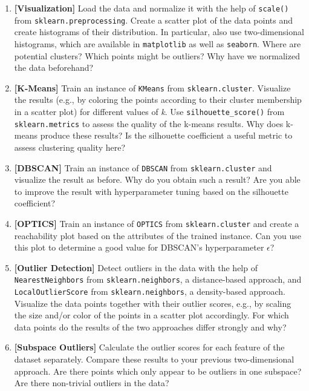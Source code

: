 \documentclass[12pt]{article}
\newcommand{\code}[1]{\textcolor{kitgreen}{\texttt{#1}}}
\newcommand{\taskname}[1]{\textcolor{kitblue}{\textbf{[#1]}}}
\begin{document}
\begin{enumerate}[label=\alph*), left=0pt, itemsep=12pt]
	\item
	\taskname{Visualization}
	Load the data and normalize it with the help of \code{scale()} from \code{sklearn.preprocessing}.
	Create a scatter plot of the data points and create histograms of their distribution.
	In particular, also use two-dimensional histograms, which are available in \code{matplotlib} as well as \code{seaborn}.
	\newline
	Where are potential clusters?
	Which points might be outliers?
	Why have we normalized the data beforehand?
	\item
	\taskname{K-Means}
	Train an instance of \code{KMeans} from \code{sklearn.cluster}.
	Visualize the results (e.g., by coloring the points according to their cluster membership in a scatter plot) for different values of \textit{k}.
	Use \code{silhouette\_score()} from \code{sklearn.metrics} to assess the quality of the k-means results.
	\newline
	Why does k-means produce these results?
	Is the silhouette coefficient a useful metric to assess clustering quality here?
	\item
	\taskname{DBSCAN}
	Train an instance of \code{DBSCAN} from \code{sklearn.cluster} and visualize the result as before.
	\newline
	Why do you obtain such a result?
	Are you able to improve the result with hyperparameter tuning based on the silhouette coefficient?
	\item
	\taskname{OPTICS}
	Train an instance of \code{OPTICS} from \code{sklearn.cluster} and create a reachability plot based on the attributes of the trained instance.
	\newline
	Can you use this plot to determine a good value for DBSCAN's hyperparameter $\epsilon$?
	\item
	\taskname{Outlier Detection}
	Detect outliers in the data with the help of \code{NearestNeighbors} from \code{sklearn.neighbors}, a distance-based approach, and \code{LocalOutlierScore} from \code{sklearn.neighbors}, a density-based approach.
	Visualize the data points together with their outlier scores, e.g., by scaling the size and/or color of the points in a scatter plot accordingly.
	\newline
	For which data points do the results of the two approaches differ strongly and why?
	\item
	\taskname{Subspace Outliers}
	Calculate the outlier scores for each feature of the dataset separately.
	Compare these results to your previous two-dimensional approach.
	\newline
	Are there points which only appear to be outliers in one subspace?
	Are there non-trivial outliers in the data?
\end{enumerate}
\end{document}
